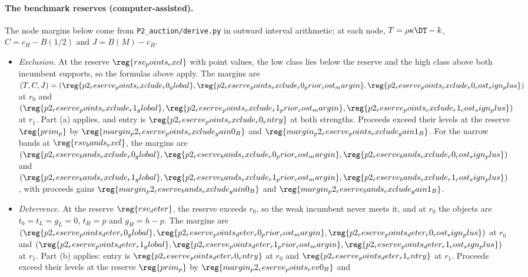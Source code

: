 \paragraph{The benchmark reserves (computer-assisted).}
The node margins below come from \nolinkurl{P2_auction/derive.py} in outward
interval arithmetic; at each node, \(T=\rho\kappa\DT-k\), \(C=c_H-B(1/2)\) and \(J=B(M)-c_H\).
\begin{itemize}[leftmargin=2em]
\item \emph{Exclusion.} At the reserve \(\reg{rsv_points_excl}\) with point values, the low class lies below the reserve
and the high class above both incumbent supports, so the formulas above apply. The margins are
\((T,C,J)=(\reg{p2_reserve_points_exclude_r0_global},\reg{p2_reserve_points_exclude_r0_prior_cost_margin},
\reg{p2_reserve_points_exclude_r0_cost_sign_plus})\) at \(r_0\) and
\((\reg{p2_reserve_points_exclude_r1_global},\reg{p2_reserve_points_exclude_r1_prior_cost_margin},
\reg{p2_reserve_points_exclude_r1_cost_sign_plus})\) at \(r_1\). Part (a) applies, and entry is
\(\reg{p2_reserve_points_exclude_r0_entry}\) at both strengths. Proceeds exceed their levels at the reserve
\(\reg{prim_p}\) by \(\reg{margin_p2_reserve_points_exclude_gain0_B}\) and \(\reg{margin_p2_reserve_points_exclude_gain1_B}\).
For the narrow bands at \(\reg{rsv_bands_excl}\), the margins are
\((\reg{p2_reserve_bands_exclude_r0_global},\reg{p2_reserve_bands_exclude_r0_prior_cost_margin},
\reg{p2_reserve_bands_exclude_r0_cost_sign_plus})\) and
\((\reg{p2_reserve_bands_exclude_r1_global},\reg{p2_reserve_bands_exclude_r1_prior_cost_margin},
\reg{p2_reserve_bands_exclude_r1_cost_sign_plus})\), with proceeds gains \(\reg{margin_p2_reserve_bands_exclude_gain0_B}\)
and \(\reg{margin_p2_reserve_bands_exclude_gain1_B}\).
\item \emph{Deterrence.} At the reserve \(\reg{rsv_deter}\), the reserve exceeds \(r_0\), so the weak incumbent never
meets it, and at \(r_0\) the objects are \(t_0=t_L=g_L=0\), \(t_H=p\) and \(g_H=h-p\). The margins are
\((\reg{p2_reserve_points_deter_r0_global},\reg{p2_reserve_points_deter_r0_prior_cost_margin},
\reg{p2_reserve_points_deter_r0_cost_sign_plus})\) at \(r_0\) and
\((\reg{p2_reserve_points_deter_r1_global},\reg{p2_reserve_points_deter_r1_prior_cost_margin},
\reg{p2_reserve_points_deter_r1_cost_sign_plus})\) at \(r_1\). Part (b) applies: entry is
\(\reg{p2_reserve_points_deter_r0_entry}\) at \(r_0\) and \(\reg{p2_reserve_points_deter_r1_entry}\) at \(r_1\). Proceeds
exceed their levels at the reserve \(\reg{prim_p}\) by \(\reg{margin_p2_reserve_points_rev0_B}\) and

\end{itemize}
